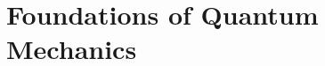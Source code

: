 \documentclass[a4paper]{article}
\begin{document}











\section{Foundations of Quantum Mechanics}
\end{document}
